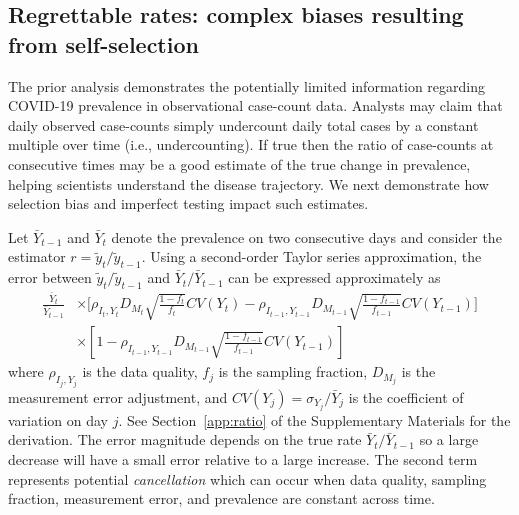 \documentclass[11pt]{amsart}
\numberwithin{equation}{section}
\theoremstyle{plain}
\begin{document}

 \subsection{Regrettable rates: complex biases resulting from self-selection}
 \label{section:rates}

 The prior analysis demonstrates the potentially limited information regarding COVID-19 prevalence in observational case-count data.  Analysts may claim that daily observed case-counts simply undercount daily total cases by a constant multiple over time (i.e., undercounting).  If true then the ratio of case-counts at consecutive times may be a good estimate of the true change in prevalence, helping scientists understand the disease trajectory.  We next demonstrate how selection bias and imperfect testing impact such estimates.

 Let $\bar Y_{t-1}$ and $\bar Y_{t}$ denote the prevalence on two consecutive days and consider the estimator $r = \tilde y_t / \tilde y_{t-1}$.  Using a second-order Taylor series approximation, the error between ${\tilde y_t}/{\tilde y_{t-1}}$ and ${\bar Y_{t}}/{\bar Y_{t-1}}$ can be expressed approximately as
 $$
 \begin{aligned}
 \frac{\bar Y_t}{\bar Y_{t-1}} &\times \bigg[ \rho_{I_t,Y_t} D_{M_t} \sqrt{\frac{1-f_t}{f_t}} CV (Y_t)  -\rho_{I_{t-1},Y_{t-1}} D_{M_{t-1}} \sqrt{\frac{1-f_{t-1}}{f_{t-1}}} CV (Y_{t-1}) \bigg] \\
 &\times \left[ 1 - \rho_{I_{t-1},Y_{t-1}} D_{M_{t-1}} \sqrt{\frac{1-f_{t-1}}{f_{t-1}}} CV (Y_{t-1}) \right]
 \end{aligned}
 $$
 where $\rho_{I_j, Y_j}$ is the data quality, $f_j$ is the sampling fraction, $D_{M_j}$ is the measurement error adjustment, and $CV(Y_j) = \sigma_{Y_j}/ \bar Y_j$ is the coefficient of variation on day $j$.  See Section~\ref{app:ratio} of the Supplementary Materials for the derivation. The error magnitude depends on the true rate $\bar Y_{t} / \bar Y_{t-1}$ so a large decrease will have a small error relative to a large increase. The second term represents potential \emph{cancellation} which can  occur when data quality, sampling fraction, measurement error, and prevalence are constant across time.
\end{document}
